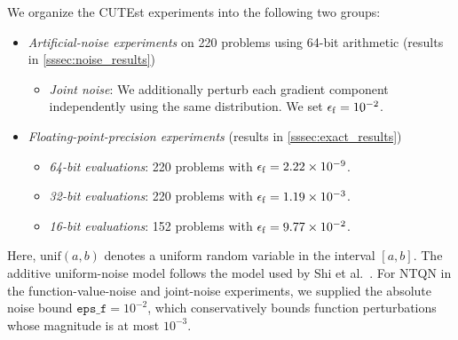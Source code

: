 \documentclass[journal_revised_MPC]{subfiles}
\begin{document}
We organize the CUTEst experiments into the following two groups:
\begin{itemize}
    \item \emph{Artificial-noise experiments} on 220 problems using 64-bit arithmetic (results in \cref{sssec:noise_results})
          \begin{itemize}
              \item \emph{Joint noise}: We additionally perturb each gradient component independently using the same distribution.
              We set $\epsilon_\mathrm{f} = 10^{-2}$.
          \end{itemize}

    \item \emph{Floating-point-precision experiments} (results in \cref{sssec:exact_results})
          \begin{itemize}
              \item \emph{64-bit evaluations}: 220 problems with $\epsilon_\mathrm{f} = 2.22 \times 10^{-9}$.
              \item \emph{32-bit evaluations}: 220 problems with $\epsilon_\mathrm{f} = 1.19 \times 10^{-3}$.
              \item \emph{16-bit evaluations}: 152 problems with $\epsilon_\mathrm{f} = 9.77 \times 10^{-2}$.
          \end{itemize}
\end{itemize}
Here, $\mathrm{unif}(a, b)$ denotes a uniform random variable in the interval $[a, b]$.
The additive uniform-noise model follows the model used by Shi et al.~\citep{shiNoiseTolerantQuasiNewtonAlgorithm2022}.
For NTQN in the function-value-noise and joint-noise experiments, we supplied the absolute noise bound $\texttt{eps\_f} = 10^{-2}$, which conservatively bounds function perturbations whose magnitude is at most $10^{-3}$.
\end{document}
